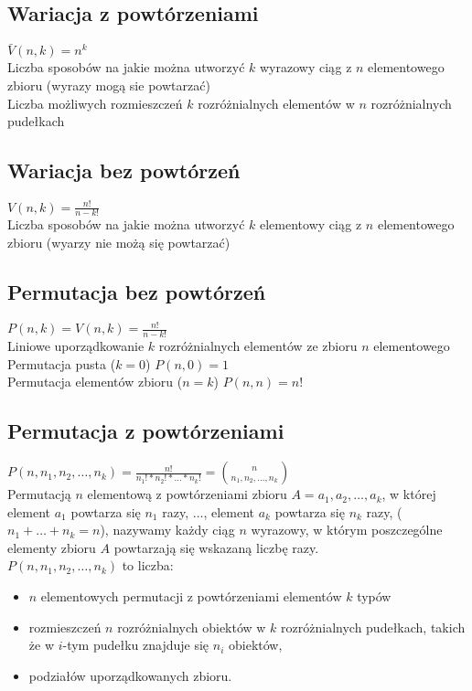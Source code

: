 \documentclass[a4paper,12pt]{article}
\begin{document}
\subsection{Wariacja z powtórzeniami} $\bar V (n, k)=n^k$ \\
Liczba sposobów na jakie można utworzyć $k$ wyrazowy ciąg z $n$ elementowego zbioru (wyrazy mogą sie powtarzać) \\
Liczba możliwych rozmieszczeń $k$ rozróżnialnych elementów w $n$ rozróżnialnych pudełkach 
\subsection{Wariacja bez powtórzeń} $V(n,k)=\frac{n!}{n-k!}$ \\
Liczba sposobów na jakie można utworzyć $k$ elementowy ciąg z $n$ elementowego zbioru (wyarzy nie możą się powtarzać)
\subsection{Permutacja bez powtórzeń} $P(n,k)=V(n,k)=\frac{n!}{n-k!}$\\
Liniowe uporządkowanie $k$ rozróżnialnych elementów ze zbioru $n$ elementowego \\
Permutacja pusta ($k=0$) $P(n,0)=1$ \\
Permutacja elementów zbioru ($n=k$) $P(n, n)=n!$
\subsection{Permutacja z powtórzeniami} $P(n,n_1,n_2,\dots ,n_k)=\frac{n!}{n_1!*n_2!*\dots *n_k!}= {{n}\choose{n_1,n_2,\dots, n_k}}$ \\
Permutacją $n$ elementową z powtórzeniami zbioru  $A=a_1,a_2,\dots,a_k$, w której element $a_1$ powtarza się $n_1$ razy, $\dots$, element $a_k$ powtarza się $n_k$ razy, ($n_1+ \dots + n_k= n$), nazywamy każdy ciąg $n$ wyrazowy, w którym poszczególne elementy zbioru $A$ powtarzają się wskazaną liczbę razy.\\
$P(n,n_1,n_2,\dots ,n_k)$ to liczba: 
\begin{itemize} \itemsep1pt \parskip0pt 
 \item $n$ elementowych permutacji z powtórzeniami elementów $k$ typów
 \item rozmieszczeń $n$ rozróżnialnych obiektów w $k$ rozróżnialnych pudełkach, takich że w $i$-tym pudełku znajduje się $n_i$ obiektów,
 \item podziałów uporządkowanych zbioru.
\end{itemize}
\end{document}
